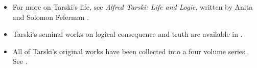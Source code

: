 \documentclass[../../../include/open-logic-section]{subfiles}
\begin{document}
\begin{reading} 
\begin{itemize} 
\item For more on Tarski's life, see
\emph{Alfred Tarski: Life and Logic}, written by Anita and Solomon Feferman
\citep{feferman2004}.

\item Tarski's seminal works on logical consequence and truth are available
in \citet{tarski1983}.

\item All of Tarski's original works have been collected into a four volume
series. See \citep{Tarski1981}. \end{itemize} 
\end{reading}
\end{document}
